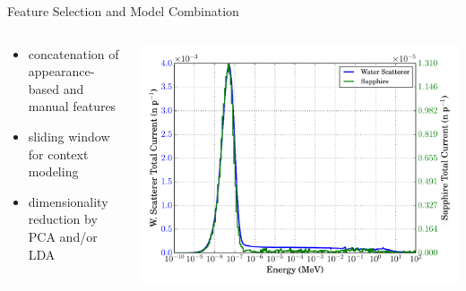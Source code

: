 \documentclass[final,t]{beamer}
\begin{document}
\begin{frame}{}
\begin{columns}[t]
\begin{column}{.3\linewidth}
      \begin{block}{Feature Selection and Model Combination}
        \begin{columns}[T]
          \begin{column}{.35\linewidth}
            \par
            \begin{itemize}
            \item \alert{concatenation} of appearance-based and manual features
            \item \alert{sliding window} for context modeling
            \item \alert{dimensionality reduction} by PCA and/or LDA
            \end{itemize}
          \end{column}
          \begin{column}{.65\linewidth}
            \raggedleft
            \includegraphics[width=.95\linewidth]{specs.pdf}%
          \end{column}
        \end{columns}


\end{block}
\end{column}
\end{columns}
\end{frame}
\end{document}
